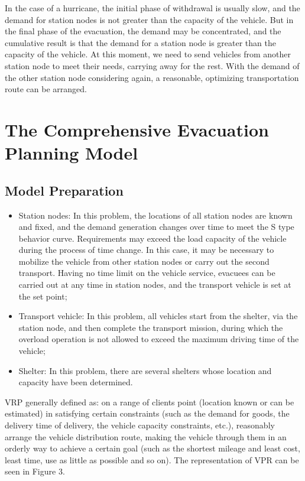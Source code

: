 \documentclass{mcmthesis}
\begin{document}
In the case of a hurricane, the initial phase of withdrawal is usually slow, and the demand for station nodes is not greater than the capacity of the vehicle. But in the final phase of the evacuation, the demand may be concentrated, and the cumulative result is that the demand for a station node is greater than the capacity of the vehicle. At this moment, we need  to send vehicles from another station node to meet their needs, carrying away for the rest. With the demand of the other station node considering again, a reasonable, optimizing transportation route can be arranged.

\section{The Comprehensive Evacuation Planning Model}
\subsection{Model Preparation}

\begin{itemize}

\item Station nodes: In this problem, the locations of all station nodes are known and fixed, and the demand generation changes over time to meet the S type behavior curve. Requirements may exceed the load capacity of the vehicle during the process of time change. In this case, it may be necessary to mobilize the vehicle from other station nodes or carry out the second transport. Having no time limit on the vehicle service, evacuees can be carried out at any time in station nodes, and the transport vehicle is set at the set point;
\item Transport vehicle: In this problem, all vehicles start from the shelter, via the station node, and then complete the transport mission, during which the overload operation is not allowed to exceed the maximum driving time of the vehicle;

\item Shelter: In this problem, there are several shelters whose location and capacity have been determined.
\end{itemize}

VRP \cite{Dikas2016Solving,He2015Model} generally defined as: on a range of clients point (location known or can be estimated) in satisfying certain constraints (such as the demand for goods, the delivery time of delivery, the vehicle capacity constraints, etc.), reasonably arrange the vehicle distribution route, making the vehicle through them in an orderly way to achieve a certain goal (such as the shortest mileage and least cost, least time, use as little as possible and so on). The representation of VPR can be seen in Figure 3.
\end{document}
